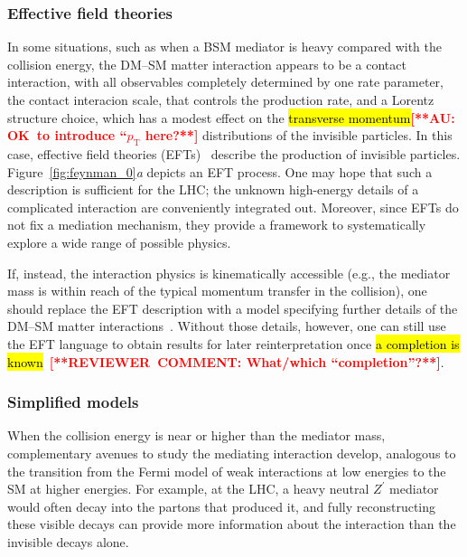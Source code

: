 \documentclass{ar-1col}
\newcommand{\IP}{invisible particle}
\newcommand{\Zprime}{\ensuremath{{Z}^\prime}\xspace}
\begin{document}
\subsubsection{Effective field theories}\label{sub:EFT}

In some situations, such as when a BSM mediator is heavy compared
with the collision energy, the DM--SM matter interaction appears to be a
contact interaction, with all observables completely determined by
one rate parameter, the contact interacion scale, that controls
the production rate, and a Lorentz structure choice, which has a
modest effect on the \hl{transverse momentum}\textbf{\textcolor{red}{[**AU: OK\ to introduce ``$p_{\mathrm {T}}$ here?**]}} distributions of the
{\IP}s. In this case, effective field theories
(EFTs)~\cite{Goodman:2010ku,Bai:2010hh,Fox:2011pm} describe the production of {\IP}s. Figure~\ref{fig:feynman_0}\textit{a} depicts an EFT
process. One may
hope that such a description is sufficient for the LHC; the
unknown high-energy details of a complicated interaction are
conveniently integrated out. Moreover, since EFTs do not fix a
mediation mechanism, they provide a framework to systematically
explore a wide range of possible physics.

If, instead, the interaction physics is kinematically accessible
(e.g., the mediator mass is within reach of the typical momentum
transfer in the collision), one should replace the EFT description
with a model specifying further details of the DM--SM matter
interactions~\cite{Shoemaker:2011vi}. Without those details,
however, one can still use the EFT language to obtain results for
later reinterpretation once \hl{a completion is
known}~\textbf{\textcolor{red}{[**REVIEWER\ COMMENT: What/which ``completion''?**]}}\cite{Racco:2015dxa,Busoni:2013lha}.

\subsubsection{Simplified models}\label{sub:simplifiedModels}

When the collision energy is near or higher than the mediator
mass, complementary avenues to study the mediating interaction
develop, analogous to the transition from the Fermi model of weak
interactions at low energies to the SM at higher
energies. For example, at the LHC, a heavy neutral \Zprime
mediator would often decay into the partons that produced it, and
fully reconstructing these visible decays can provide more
information about the interaction than the invisible decays alone.
\end{document}
